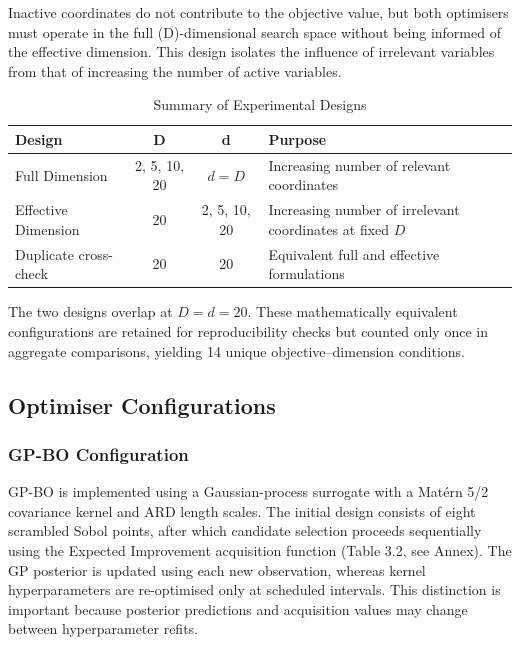 \documentclass[11pt]{article}
\begin{document}
\noindent Inactive coordinates do not contribute to the objective value, but both optimisers must operate in the full (D)-dimensional search space without being informed of the effective dimension. This design isolates the influence of irrelevant variables from that of increasing the number of active variables. 
\renewcommand{\thetable}{3.\arabic{table}}
\setcounter{table}{0}

\begin{table}[htbp]
    \centering
    \caption{Summary of Experimental Designs}
    \label{tab:experimental_designs}
    \begin{tabular}{lccp{5cm}}
        \toprule
        \textbf{Design} & \textbf{D} & \textbf{d} & \textbf{Purpose} \\
        \midrule
        Full Dimension & 2, 5, 10, 20 & $d = D$ &
        Increasing number of relevant coordinates \\
        Effective Dimension & 20 & 2, 5, 10, 20 &
        Increasing number of irrelevant coordinates at fixed $D$ \\
        Duplicate cross-check & 20 & 20 &
        Equivalent full and effective formulations \\
        \bottomrule
    \end{tabular}
\end{table}

\noindent The two designs overlap at $D=d=20$. These mathematically equivalent configurations are retained for reproducibility checks but counted only once in aggregate comparisons, yielding 14 unique objective–dimension conditions. 

\subsection{Optimiser Configurations}

\subsubsection{GP-BO Configuration}
GP-BO is implemented using a Gaussian-process surrogate with a Matérn 5/2 covariance kernel and ARD length scales. The initial design consists of eight scrambled Sobol points, after which candidate selection proceeds sequentially using the Expected Improvement acquisition function (Table 3.2, see Annex). The GP posterior is updated using each new observation, whereas kernel hyperparameters are re-optimised only at scheduled intervals. This distinction is important because posterior predictions and acquisition values may change between hyperparameter refits.
\end{document}
